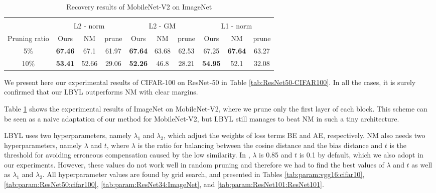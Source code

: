 \begin{table}[htb!]
\centering
\scriptsize
\begin{tabular}{c ||c |c |c |c |c |c |c |c |c } \Xhline{2\arrayrulewidth}
\multicolumn{10}{c}{\textbf{MobileNet-V2 (Acc. 71.88) }} \\ \Xhline{2\arrayrulewidth} %
\multicolumn{1}{l||}{Pruning criterion} & \multicolumn{3}{c|}{ L2 - norm} & \multicolumn{3}{c|}{ L2 - GM} & \multicolumn{3}{c}{L1 - norm} \\ \hline
Pruning ratio & Ours & NM & prune & Ours & NM & prune & Ours & NM & prune \\ \hline
5\% & \textbf{67.46} & 67.1 & 61.97 & \textbf{67.64} & 63.68 & 62.53 & 67.25 & \textbf{67.64} & 63.27 \\ \hline
10\% & \textbf{53.41} & 52.66& 29.06 & \textbf{52.26} & 46.8& 28.21 & \textbf{54.95} & 52.1& 32.08 \\ \hline
\end{tabular}%
\vspace{2mm}
\caption{Recovery results of MobileNet-V2 on ImageNet}
\label{tab:mobilenet}
\end{table}

We present here our experimental results of CIFAR-100 on ResNet-50 in Table \ref{tab:ResNet50-CIFAR100}. In all the cases, it is surely confirmed that our LBYL outperforms NM with clear margins.

Table \ref{tab:mobilenet} shows the experimental results of ImageNet on MobileNet-V2, where we prune only the first layer of each block. This scheme can be seen as a naive adaptation of our method for MobileNet-V2, but LBYL still manages to beat NM in such a tiny architecture.



LBYL uses two hyperparameters, namely $\lambda_1$ and $\lambda_2$, which adjust the weights of loss terms BE and AE, respectively. NM \cite{NM} also needs two hyperparameters, namely $\lambda$ and $t$, where $\lambda$ is the ratio for balancing between the cosine distance and the bias distance and $t$ is the threshold for avoiding erroneous compensation caused by the low similarity. In \cite{NM}, $\lambda$ is 0.85 and $t$ is 0.1 by default, which we also adopt in our experiments. However, these values do not work well in random pruning and therefore we had to find the best values of $\lambda$ and $t$ as well as $\lambda_1$ and $\lambda_2$. All hyperparameter values are found by grid search, and presented in Tables \ref{tab:param:vgg16:cifar10}, \ref{tab:param:ResNet50:cifar100}, \ref{tab:param:ResNet34:ImageNet}, and \ref{tab:param:ResNet101:ResNet101}.


